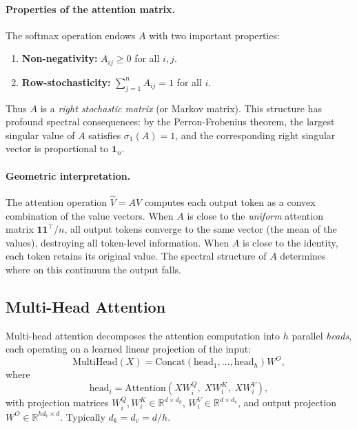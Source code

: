 \documentclass[12pt, a4paper]{article}
\begin{document}
\paragraph{Properties of the attention matrix.}
The softmax operation endows $A$ with two important properties:
\begin{enumerate}[label=(\alph*)]
    \item \textbf{Non-negativity:} $A_{ij} \geq 0$ for all $i, j$.
    \item \textbf{Row-stochasticity:} $\sum_{j=1}^{n} A_{ij} = 1$
          for all $i$.
\end{enumerate}
Thus $A$ is a \textit{right stochastic matrix} (or Markov matrix).
This structure has profound spectral consequences: by the
Perron-Frobenius theorem, the largest singular value of $A$ satisfies
$\sigma_1(A) = 1$, and the corresponding right singular vector is
proportional to $\mathbf{1}_n$.

\paragraph{Geometric interpretation.}
The attention operation $\hat{V} = AV$ computes each output token as a
convex combination of the value vectors. When $A$ is close to the
\textit{uniform} attention matrix $\mathbf{1}\mathbf{1}^\top / n$, all
output tokens converge to the same vector (the mean of the values),
destroying all token-level information. When $A$ is close to the
identity, each token retains its original value. The spectral structure
of $A$ determines where on this continuum the output falls.

\subsection{Multi-Head Attention}

Multi-head attention decomposes the attention computation into $h$
parallel \textit{heads}, each operating on a learned linear projection
of the input:
\begin{equation}
    \text{MultiHead}(X) = \text{Concat}\!\left(\text{head}_1, \ldots, \text{head}_h\right) W^O,
    \label{eq:mha_detail}
\end{equation}
where
\begin{equation}
    \text{head}_i = \text{Attention}\!\left(X W_i^Q,\; X W_i^K,\; X W_i^V\right),
    \label{eq:head_i}
\end{equation}
with projection matrices $W_i^Q, W_i^K \in \mathbb{R}^{d \times d_k}$,
$W_i^V \in \mathbb{R}^{d \times d_v}$, and output projection
$W^O \in \mathbb{R}^{hd_v \times d}$. Typically $d_k = d_v = d / h$.
\end{document}

